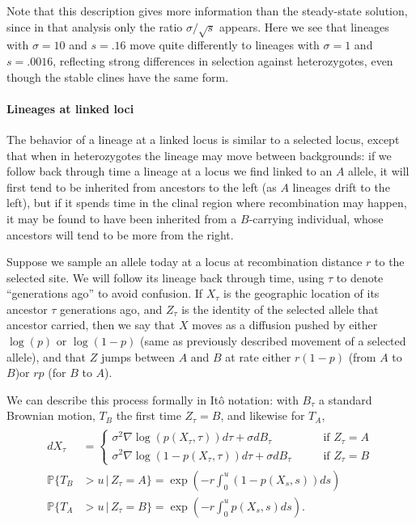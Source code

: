 \documentclass[11pt,letterpaper]{article}
\renewcommand{\P}{\mathbb{P}}
\newcommand{\grad}{\nabla}
\newcommand{\given}{\,\vert\,}
\begin{document}
Note that this description gives more information than the steady-state solution,
since in that analysis only the ratio $\sigma/\sqrt{s}$ appears.
Here we see that lineages with $\sigma=10$ and $s=.16$ move quite differently
to lineages with $\sigma=1$ and $s=.0016$,
reflecting strong differences in selection against heterozygotes,
even though the stable clines have the same form.

\paragraph{Lineages at linked loci}
The behavior of a lineage at a linked locus is similar to a selected locus,
except that when in heterozygotes the lineage may move between backgrounds:
if we follow back through time a lineage at a locus we find linked to an $A$ allele, 
it will first tend to be inherited from ancestors to the left (as $A$ lineages drift to the left),
but if it spends time in the clinal region where recombination may happen,
it may be found to have been inherited from a $B$-carrying individual,
whose ancestors will tend to be more from the right.

Suppose we sample an allele today at a locus at recombination distance $r$ to the selected site.
We will follow its lineage back through time, using $\tau$ to denote ``generations ago'' to avoid confusion.
If $X_\tau$ is the geographic location of its ancestor $\tau$ generations ago,
and $Z_\tau$ is the identity of the selected allele that ancestor carried,
then we say that $X$ moves as a diffusion pushed by either $\log(p)$ or $\log(1-p)$ (same as previously described movement of a selected allele),
and that $Z$ jumps between $A$ and $B$ at rate either $r (1-p)$  (from $A$ to $B$)or $r p$ (for $B$ to $A$).

We can describe this process formally in It\^o notation:
with $B_\tau$ a standard Brownian motion,
$T_B$ the first time $Z_\tau = B$, and likewise for $T_A$,
\begin{align}
    \begin{aligned} \label{eqn:lineage_motion}
        dX_\tau &= \begin{cases}
             \sigma^2 \grad \log(p(X_\tau,\tau)) d\tau + \sigma dB_\tau \qquad & \text{if } Z_\tau = A \\
             \sigma^2 \grad \log(1-p(X_\tau,\tau)) d\tau + \sigma dB_\tau \qquad & \text{if } Z_\tau = B 
        \end{cases} \\
        \P\{ T_B &> u \given Z_\tau = A \} = \exp\left( - r \int_0^u (1-p(X_s,s)) ds \right) \\
        \P\{ T_A &> u \given Z_\tau = B \} = \exp\left( - r \int_0^u p(X_s,s) ds \right) .
    \end{aligned}
\end{align}
\end{document}
